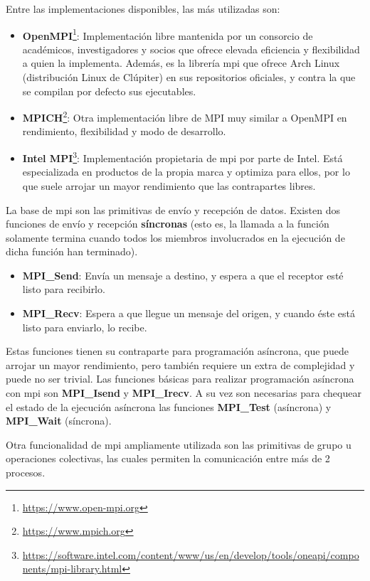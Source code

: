 Entre las implementaciones disponibles, las más utilizadas son:
\begin{itemize}
  \item\textbf{OpenMPI}\footnote{\url{https://www.open-mpi.org}}: Implementación libre mantenida por un consorcio de académicos, investigadores y socios que ofrece elevada eficiencia y flexibilidad a quien la implementa. Además, es la librería \acrshort{mpi} que ofrece Arch Linux (distribución Linux de Clúpiter) en sus repositorios oficiales, y contra la que se compilan por defecto sus ejecutables.
  \item\textbf{MPICH}\footnote{\url{https://www.mpich.org}}: Otra implementación libre de MPI muy similar a OpenMPI en rendimiento, flexibilidad y modo de desarrollo.
  \item\textbf{Intel MPI}\footnote{\url{https://software.intel.com/content/www/us/en/develop/tools/oneapi/components/mpi-library.html}}: Implementación propietaria de \acrshort{mpi} por parte de Intel. Está especializada en productos de la propia marca y optimiza para ellos, por lo que suele arrojar un mayor rendimiento que las contrapartes libres.
\end{itemize}

La base de \acrshort{mpi} son las primitivas de envío y recepción de datos. Existen dos funciones de envío y recepción \textbf{síncronas} (esto es, la llamada a la función solamente termina cuando todos los miembros involucrados en la ejecución de dicha función han terminado).
\begin{itemize}
  \item \textbf{MPI\_Send}: Envía un mensaje a destino, y espera a que el receptor esté listo para recibirlo. 
  \item \textbf{MPI\_Recv}: Espera a que llegue un mensaje del origen, y cuando éste está listo para enviarlo, lo recibe.
\end{itemize}

Estas funciones tienen su contraparte para programación asíncrona, que puede arrojar un mayor rendimiento, pero también requiere un extra de complejidad y puede no ser trivial. Las funciones básicas para realizar programación asíncrona con \acrshort{mpi} son \textbf{MPI\_Isend} y \textbf{MPI\_Irecv}. A su vez son necesarias para chequear el estado de la ejecución asíncrona las funciones \textbf{MPI\_Test} (asíncrona) y \textbf{MPI\_Wait} (síncrona).

Otra funcionalidad de \acrshort{mpi} ampliamente utilizada son las primitivas de grupo u operaciones colectivas, las cuales permiten la comunicación entre más de 2 procesos.


